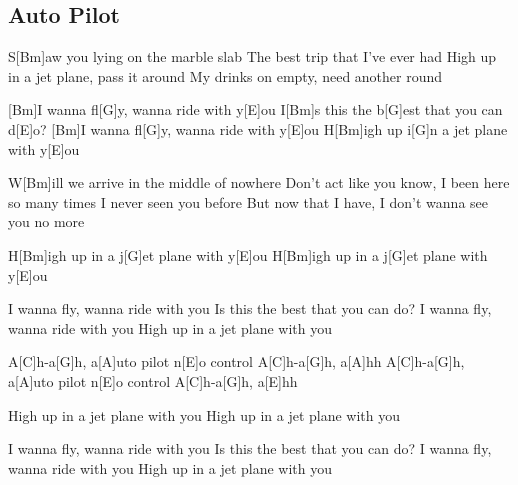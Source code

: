 \subsection*{Auto Pilot   }
\begin{guitar}
S[Bm]aw you lying on the marble slab
The best trip that I've ever had
High up in a jet plane, pass it around
My drinks on empty, need another round



[Bm]I wanna fl[G]y, wanna ride with y[E]ou
I[Bm]s this the b[G]est that you can d[E]o?
[Bm]I wanna fl[G]y, wanna ride with y[E]ou
H[Bm]igh up i[G]n a jet plane with y[E]ou



W[Bm]ill we arrive in the middle of nowhere
Don't act like you know, I been here so many times
I never seen you before
But now that I have, I don't wanna see you no more



H[Bm]igh up in a j[G]et plane with y[E]ou
H[Bm]igh up in a j[G]et plane with y[E]ou



I wanna fly, wanna ride with you
Is this the best that you can do?
I wanna fly, wanna ride with you
High up in a jet plane with you



A[C]h-a[G]h, a[A]uto pilot n[E]o control
A[C]h-a[G]h, a[A]hh
A[C]h-a[G]h, a[A]uto pilot n[E]o control
A[C]h-a[G]h, a[E]hh



High up in a jet plane with you
High up in a jet plane with you



I wanna fly, wanna ride with you
Is this the best that you can do?
I wanna fly, wanna ride with you
High up in a jet plane with you
\end{guitar}
